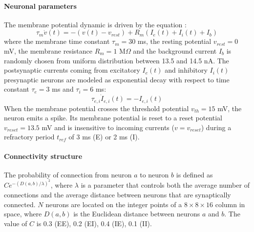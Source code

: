 \documentclass[11pt, a4paper]{article} %
\begin{document}
\paragraph{Neuronal parameters}
The membrane potential dynamic is driven by the equation :
\begin{equation}
\tau_m \dot{v}(t) = -(v(t)-v_{rest}) + R_m (I_e(t) + I_i(t) + I_b)
\label{IaF}
\end{equation}
where the membrane time constant $\tau_m = 30$ ms, the resting potential $v_{rest} = 0$ mV, the membrane resistance $R_m = 1$ M$\Omega$ and the background current $I_b$ is randomly chosen from uniform distribution between 13.5 and 14.5 nA. The postsynaptic currents coming from excitatory $I_e(t)$  and inhibitory $I_i(t)$ presynaptic neurons are modeled as exponential decay with respect to time constant $\tau_e = 3$ ms and $\tau_i = 6$ ms:
\begin{equation}
\tau_{e,i} \dot{I}_{e,i}(t) = -I_{e,i}(t)
\end{equation}
When the membrane potential crosses the threshold potential $v_{th} = 15$ mV, the neuron emits a spike. Its membrane potential is reset to a reset potential $v_{reset} = 13.5$ mV and is insensitive to incoming currents ($v = v_{reset}$) during a refractory period $t_{ref}$ of 3 ms (E) or 2 ms (I).

\paragraph{Connectivity structure}
The probability of connection from neuron $a$ to neuron $b$ is defined as $C e^{-(D(a,b)/\lambda)^2}$, where $\lambda$ is a parameter that controls both the average number of connections and the average distance between neurons that are synaptically connected. $N$ neurons are located on the integer points of a $8 \times 8 \times 16$ column in space, where $D(a,b)$ is the Euclidean distance between neurons $a$ and $b$. The value of $C$ is 0.3 (EE), 0.2 (EI), 0.4 (IE), 0.1 (II).
\end{document}
